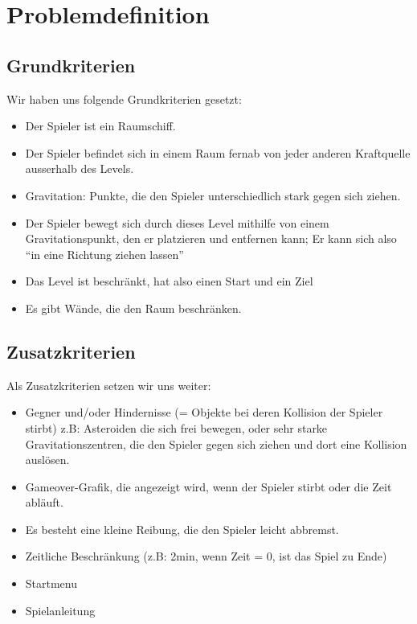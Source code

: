 \documentclass[12pt,a4paper]{scrartcl}
\newcommand{\q}[1]{``#1''}
\begin{document}
\section{Problemdefinition}
\subsection{Grundkriterien}
Wir haben uns folgende Grundkriterien gesetzt:
\begin{itemize}
\item Der Spieler ist ein Raumschiff.
\item Der Spieler befindet sich in einem Raum fernab von jeder anderen Kraftquelle ausserhalb des Levels.
\item Gravitation: Punkte, die den Spieler unterschiedlich stark gegen sich ziehen.
\item Der Spieler bewegt sich durch dieses Level mithilfe von  einem Gravitationspunkt, den er platzieren und entfernen kann; Er kann sich also \q{in eine Richtung ziehen lassen}
\item Das Level ist beschränkt, hat also einen Start und ein Ziel
\item Es gibt Wände, die den Raum beschränken.
\end{itemize}

\subsection{Zusatzkriterien}
Als Zusatzkriterien setzen wir uns weiter:
\begin{itemize}
\item Gegner und/oder Hindernisse (= Objekte bei deren Kollision der Spieler stirbt) z.B: Asteroiden die sich frei bewegen, oder sehr starke Gravitationszentren, die den Spieler gegen sich ziehen und dort eine Kollision auslösen.
\item Gameover-Grafik, die angezeigt wird, wenn der Spieler stirbt oder die Zeit abläuft.
\item Es besteht eine kleine Reibung, die den Spieler leicht abbremst.
\item Zeitliche Beschränkung (z.B: 2min, wenn Zeit = 0, ist das Spiel zu Ende)
\item Startmenu
\item Spielanleitung
\end{itemize}
\end{document}
